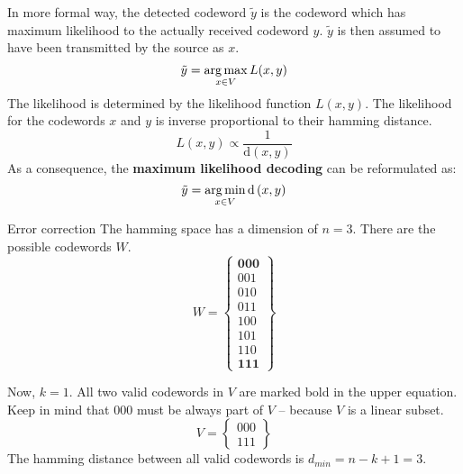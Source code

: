 \begin{refsection}
In more formal way, the detected codeword $\tilde{y}$ is the codeword which has maximum likelihood to the actually received codeword $y$. $\tilde{y}$ is then assumed to have been transmitted by the source as $x$.
\begin{equation}
	\tilde{y} = \operatorname*{arg\,max}\limits_{x \in V} L(x, y)
\end{equation}
The likelihood is determined by the likelihood function $L(x, y)$. The likelihood for the codewords $x$ and $y$ is inverse proportional to their hamming distance.
\begin{equation}
	L(x, y) \propto \frac{1}{\mathrm{d}\left(x, y\right)}
\end{equation}
As a consequence, the  \textbf{maximum likelihood decoding} can be reformulated as:
\begin{equation}
	\tilde{y} = \operatorname*{arg\,min}\limits_{x \in V} \mathrm{d}\left(x, y\right)
\end{equation}

\begin{example}{Error correction}
	The hamming space has a dimension of $n = 3$. There are the possible codewords $W$.
	\begin{equation}
		W = \left\{\begin{matrix}
			\mathbf{000}\\
			001\\
			010\\
			011\\
			100\\
			101\\
			110\\
			\mathbf{111}
		\end{matrix}\right\}
	\end{equation}
	
	Now, $k = 1$. All two valid codewords in $V$ are marked bold in the upper equation. Keep in mind that $000$ must be always part of $V$ -- because $V$ is a linear subset.
	\begin{equation}
		V = \left\{\begin{matrix}
			000\\
			111
		\end{matrix}\right\}
	\end{equation}
	The hamming distance between all valid codewords is $d_{min} = n - k + 1 = 3$.
	

\end{example}
\end{refsection}
